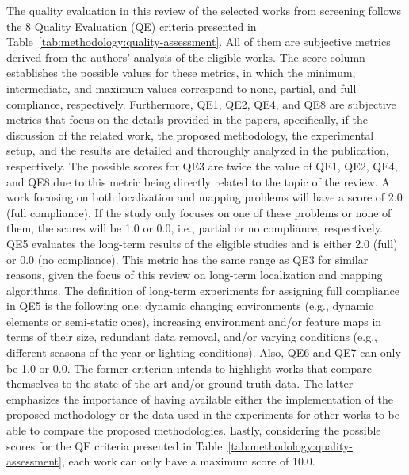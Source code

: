 \documentclass[10pt,a4paper,notitlepage,twocolumn,oneside]{article}
\begin{document}
The quality evaluation in this review of the selected works from screening follows the 8 Quality Evaluation (QE) criteria presented in Table~\ref{tab:methodology:quality-assessment}. All of them are subjective metrics derived from the authors' analysis of the eligible works. The score column establishes the possible values for these metrics, in which the minimum, intermediate, and maximum values correspond to none, partial, and full compliance, respectively.
Furthermore, QE1, QE2, QE4, and QE8 are subjective metrics that focus on the details provided in the papers, specifically, if the discussion of the related work, the proposed methodology, the experimental setup, and the results are detailed and thoroughly analyzed in the publication, respectively.
The possible scores for QE3 are twice the value of QE1, QE2, QE4, and QE8 due to this metric being directly related to the topic of the review. A work focusing on both localization and mapping problems will have a score of 2.0 (full compliance). If the study only focuses on one of these problems or none of them, the scores will be 1.0 or 0.0, i.e., partial or no compliance, respectively.
QE5 evaluates the long-term results of the eligible studies and is either 2.0 (full) or 0.0 (no compliance). This metric has the same range as QE3 for similar reasons, given the focus of this review on long-term localization and mapping algorithms.
The definition of long-term experiments for assigning full compliance in QE5 is the following one: dynamic changing environments (e.g., dynamic elements or semi-static ones), increasing environment and/or feature maps in terms of their size, redundant data removal, and/or varying conditions (e.g., different seasons of the year or lighting conditions).
Also, QE6 and QE7 can only be 1.0 or 0.0. The former criterion intends to highlight works that compare themselves to the state of the art and/or ground-truth data. The latter emphasizes the importance of having available either the implementation of the proposed methodology or the data used in the experiments for other works to be able to compare the proposed methodologies.
Lastly, considering the possible scores for the QE criteria presented in Table~\ref{tab:methodology:quality-assessment}, each work can only have a  maximum score of 10.0.
\end{document}
